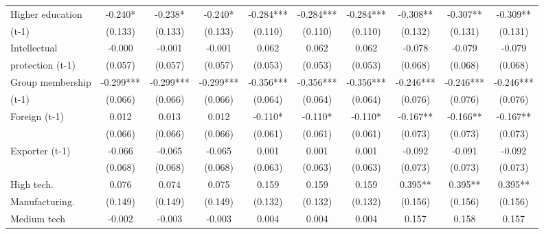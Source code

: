 \begin{table}[htbp]
\begin{tabular}{l*{9}{c}}
Higher education    &      -0.240*  &      -0.238*  &      -0.240*  &      -0.284***&      -0.284***&      -0.284***&      -0.308** &      -0.307** &      -0.309** \\
(t-1)               &     (0.133)   &     (0.133)   &     (0.133)   &     (0.110)   &     (0.110)   &     (0.110)   &     (0.132)   &     (0.131)   &     (0.131)   \\
Intellectual        &      -0.000   &      -0.001   &      -0.001   &       0.062   &       0.062   &       0.062   &      -0.078   &      -0.079   &      -0.079   \\
protection (t-1)    &     (0.057)   &     (0.057)   &     (0.057)   &     (0.053)   &     (0.053)   &     (0.053)   &     (0.068)   &     (0.068)   &     (0.068)   \\
Group membership    &      -0.299***&      -0.299***&      -0.299***&      -0.356***&      -0.356***&      -0.356***&      -0.246***&      -0.246***&      -0.246***\\
(t-1)               &     (0.066)   &     (0.066)   &     (0.066)   &     (0.064)   &     (0.064)   &     (0.064)   &     (0.076)   &     (0.076)   &     (0.076)   \\
Foreign (t-1)       &       0.012   &       0.013   &       0.012   &      -0.110*  &      -0.110*  &      -0.110*  &      -0.167** &      -0.166** &      -0.167** \\
                    &     (0.066)   &     (0.066)   &     (0.066)   &     (0.061)   &     (0.061)   &     (0.061)   &     (0.073)   &     (0.073)   &     (0.073)   \\
Exporter (t-1)      &      -0.066   &      -0.065   &      -0.065   &       0.001   &       0.001   &       0.001   &      -0.092   &      -0.091   &      -0.092   \\
                    &     (0.068)   &     (0.068)   &     (0.068)   &     (0.063)   &     (0.063)   &     (0.063)   &     (0.073)   &     (0.073)   &     (0.073)   \\
High tech.          &       0.076   &       0.074   &       0.075   &       0.159   &       0.159   &       0.159   &       0.395** &       0.395** &       0.395** \\
Manufacturing.      &     (0.149)   &     (0.149)   &     (0.149)   &     (0.132)   &     (0.132)   &     (0.132)   &     (0.156)   &     (0.156)   &     (0.156)   \\
Medium tech         &      -0.002   &      -0.003   &      -0.003   &       0.004   &       0.004   &       0.004   &       0.157   &       0.158   &       0.157   \\

\end{tabular}
\end{table}
